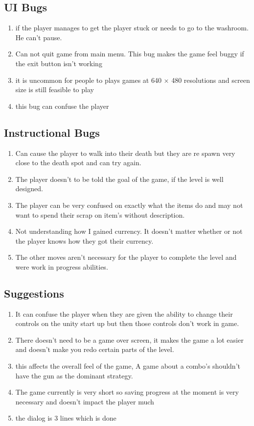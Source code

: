 \documentclass{article}
\begin{document}
\subsection*{UI Bugs}
\begin{enumerate}
	\item if the player manages to get the player stuck or needs to go to the washroom. He can't pause.
	\item Can not quit game from main menu. This bug makes the game feel buggy if the exit button isn't working 
	\item it is uncommon for people to plays games at 640 × 480 resolutions and screen size is still feasible to play
	\item this bug can confuse the player
	
\end{enumerate}
\subsection*{Instructional Bugs}
\begin{enumerate}
	\item Can cause the player to walk into their death but they are re spawn very close to the death spot and can try again. 
	\item The player doesn't to be told the goal of the game, if the level is well designed.
	\item  The player can be very confused on exactly what the items do and may not want to spend their scrap on item's without description.
	\item Not understanding how I gained currency. It doesn't matter whether or not the player knows how they got their currency. 
	\item The other moves aren't necessary for the player to complete the level and were work in progress abilities. 
\end{enumerate}
\subsection*{Suggestions}
\begin{enumerate}
	\item  It can confuse the player when they are given the ability to change their controls on the unity start up but then those controls don't work in game. 
	\item There doesn't need to be a game over screen, it makes the game a lot easier and doesn't make you redo certain parts of the level.
	\item this affects the overall feel of the game, A game about a combo's shouldn't have the gun as the dominant strategy.
	\item The game currently is very short so saving progress at the moment is very necessary and doesn't impact the player much 
	\item the dialog is 3 lines which is done
\end{enumerate} 
\end{document}
